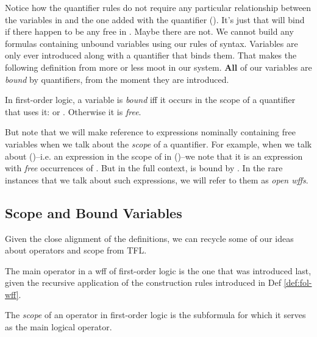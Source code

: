 Notice how the quantifier rules do not require any particular relationship
between the variables in \ephi and the one added with the quantifier (\exi).
It's just that \eexists\exi will bind \exi if there happen to be any free in
\ephi. Maybe there are not. We cannot build any formulas containing unbound
variables using our rules of syntax. Variables are only ever introduced along
with a quantifier that binds them. That makes the following definition from
\cite{Mag25} more or less moot in our system. \textbf{All} of our variables are
\emph{bound} by quantifiers, from the moment they are introduced.

\begin{definition}
  \label{def:fol-bound-variable}
  In first-order logic, a variable \exi is \emph{bound} iff it occurs in
  the scope of a quantifier that uses it: \eforall\exi or \eexists\exi.
  Otherwise it is \emph{free}.
\end{definition}

But note that we will make reference to expressions nominally containing free
variables when we talk about the \emph{scope} of a quantifier. For example, when
we talk about \ephi(\exi)--i.e. an expression in the scope of \eexists\exi in
\eexists\exi\ephi(\exi)--we note that it is an expression with \emph{free}
occurrences of \exi. But in the full context, \exi is bound by \eexists\exi. In
the rare instances that we talk about such expressions, we will refer to them
as \emph{open wffs}.

\subsection{Scope and Bound Variables}

Given the close alignment of the definitions, we can recycle some of our ideas
about operators and scope from TFL.

\begin{definition}
  \label{def:fol-main-operator}
  The main operator in a wff of first-order logic is the one that was
  introduced last, given the recursive application of the construction rules
  introduced in Def \ref{def:fol-wff}.
\end{definition}

\begin{definition}[Scope]
  \label{def:fol-scope}
  The \emph{scope} of an operator in first-order logic is the subformula for
  which it serves as the main logical operator.
\end{definition}

